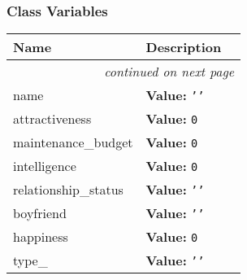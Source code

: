 
  \subsubsection{Class Variables}

    \vspace{-1cm}
\hspace{\varindent}\begin{longtable}{|p{\varnamewidth}|p{\vardescrwidth}|l}
\cline{1-2}
\cline{1-2} \centering \textbf{Name} & \centering \textbf{Description}& \\
\cline{1-2}
\endhead\cline{1-2}\multicolumn{3}{r}{\small\textit{continued on next page}}\\\endfoot\cline{1-2}
\endlastfoot\raggedright n\-a\-m\-e\- & \raggedright \textbf{Value:} 
{\tt \texttt{'}\texttt{}\texttt{'}}&\\
\cline{1-2}
\raggedright a\-t\-t\-r\-a\-c\-t\-i\-v\-e\-n\-e\-s\-s\- & \raggedright \textbf{Value:} 
{\tt 0}&\\
\cline{1-2}
\raggedright m\-a\-i\-n\-t\-e\-n\-a\-n\-c\-e\-\_\-b\-u\-d\-g\-e\-t\- & \raggedright \textbf{Value:} 
{\tt 0}&\\
\cline{1-2}
\raggedright i\-n\-t\-e\-l\-l\-i\-g\-e\-n\-c\-e\- & \raggedright \textbf{Value:} 
{\tt 0}&\\
\cline{1-2}
\raggedright r\-e\-l\-a\-t\-i\-o\-n\-s\-h\-i\-p\-\_\-s\-t\-a\-t\-u\-s\- & \raggedright \textbf{Value:} 
{\tt \texttt{'}\texttt{}\texttt{'}}&\\
\cline{1-2}
\raggedright b\-o\-y\-f\-r\-i\-e\-n\-d\- & \raggedright \textbf{Value:} 
{\tt \texttt{'}\texttt{}\texttt{'}}&\\
\cline{1-2}
\raggedright h\-a\-p\-p\-i\-n\-e\-s\-s\- & \raggedright \textbf{Value:} 
{\tt 0}&\\
\cline{1-2}
\raggedright t\-y\-p\-e\-\_\- & \raggedright \textbf{Value:} 
{\tt \texttt{'}\texttt{}\texttt{'}}&\\
\cline{1-2}
\end{longtable}

